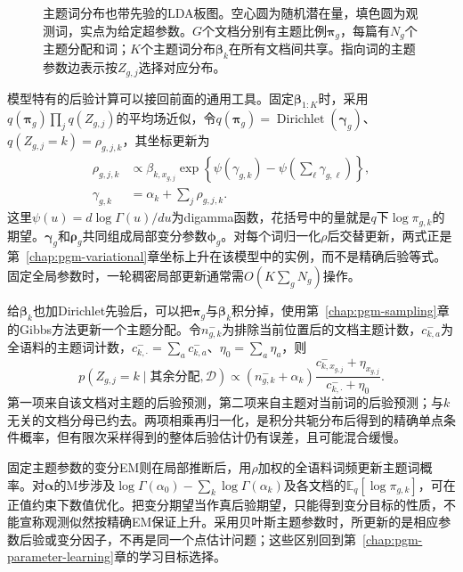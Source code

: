 \begin{figure}[htbp]
  \centering
  
  \caption{主题词分布也带先验的LDA板图。空心圆为随机潜在量，填色圆为观测词，实点为给定超参数。$G$个文档分别有主题比例$\bm{\pi}_g$，每篇有$N_g$个主题分配和词；$K$个主题词分布$\bm{\beta}_k$在所有文档间共享。指向词的主题参数边表示按$Z_{g,j}$选择对应分布。}
  \label{fig:pgm-static-directed-plates}
\end{figure}

模型特有的后验计算可以接回前面的通用工具。固定$\bm{\beta}_{1:K}$时，采用$q(\bm{\pi}_g)\prod_jq(Z_{g,j})$的平均场近似，令$q(\bm{\pi}_g)=\operatorname{Dirichlet}(\bm{\gamma}_g)$、$q(Z_{g,j}=k)=\rho_{g,j,k}$，其坐标更新为
\begin{equation}
  \label{eq:pgm-static-directed-lda-vi}
  \begin{aligned}
    \rho_{g,j,k}&\propto
      \beta_{k,x_{g,j}}
       \exp\!\left\{\psi(\gamma_{g,k})
                   -\psi\!\left(\sum_\ell\gamma_{g,\ell}\right)\right\},\\
    \gamma_{g,k}&=\alpha_k+\sum_j\rho_{g,j,k}.
  \end{aligned}
\end{equation}
这里$\psi(u)=d\log\Gamma(u)/du$为digamma函数，花括号中的量就是$q$下$\log\pi_{g,k}$的期望。$\bm{\gamma}_g$和$\bm{\rho}_g$共同组成局部变分参数$\bm{\phi}_g$。对每个词归一化$\rho$后交替更新，两式正是第~\ref{chap:pgm-variational}章坐标上升在该模型中的实例，而不是精确后验等式。固定全局参数时，一轮稠密局部更新通常需$O(K\sum_gN_g)$操作。

给$\bm{\beta}_k$也加Dirichlet先验后，可以把$\bm{\pi}_g$与$\bm{\beta}_k$积分掉，使用第~\ref{chap:pgm-sampling}章的Gibbs方法更新一个主题分配。令$n_{g,k}^{-}$为排除当前位置后的文档主题计数，$c_{k,a}^{-}$为全语料的主题词计数，$c_{k,\cdot}^{-}=\sum_a c_{k,a}^{-}$、$\eta_0=\sum_a\eta_a$，则
\begin{equation}
  \label{eq:pgm-static-directed-lda-gibbs}
  p(Z_{g,j}=k\mid\text{其余分配},\mathcal{D})
     \propto (n_{g,k}^{-}+\alpha_k)
        \frac{c_{k,x_{g,j}}^{-}+\eta_{x_{g,j}}}
             {c_{k,\cdot}^{-}+\eta_0}.
\end{equation}
第一项来自该文档对主题的后验预测，第二项来自主题对当前词的后验预测；与$k$无关的文档分母已约去。两项相乘再归一化，是积分共轭分布后得到的精确单点条件概率，但有限次采样得到的整体后验估计仍有误差，且可能混合缓慢。

固定主题参数的变分EM则在局部推断后，用$\rho$加权的全语料词频更新主题词概率。对$\bm{\alpha}$的M步涉及$\log\Gamma(\alpha_0)-\sum_k\log\Gamma(\alpha_k)$及各文档的$\mathbb{E}_q[\log\pi_{g,k}]$，可在正值约束下数值优化。把变分期望当作真后验期望，只能得到变分目标的性质，不能宣称观测似然按精确EM保证上升。采用贝叶斯主题参数时，所更新的是相应参数后验或变分因子，不再是同一个点估计问题；这些区别回到第~\ref{chap:pgm-parameter-learning}章的学习目标选择。

